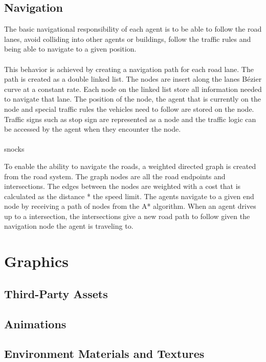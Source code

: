 \subsection{Navigation}
The basic navigational responsibility of each agent is to be able to follow the road lanes, avoid colliding into other agents or buildings, follow the traffic rules and being able to navigate to a given position.
\\\\
This behavior is achieved by creating a navigation path for each road lane. The path is created as a double linked list. The nodes are insert along the lanes Bézier curve at a constant rate. Each node on the linked list store all information needed to navigate that lane. The position of the node, the agent that is currently on the node and special traffic rules the vehicles need to follow are stored on the node. Traffic signs such as stop sign are represented as a node and the traffic logic can be accessed by the agent when they encounter the node.
\\\\

snocks



To enable the ability to navigate the roads, a weighted directed graph is created from the road system.
The graph nodes are all the road endpoints and intersections. The edges between the nodes are weighted with a cost that is calculated as the distance * the speed limit.
The agents navigate to a given end node by receiving a path of nodes from the A* algorithm. When an agent drives up to a intersection, the intersections give a new road path to follow given the navigation node the agent is traveling to.


\section{Graphics}

\subsection{Third-Party Assets}

\subsection{Animations}

\subsection{Environment Materials and Textures}



